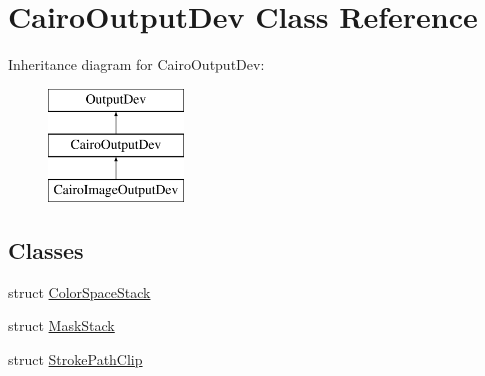 \hypertarget{class_cairo_output_dev}{}\section{Cairo\+Output\+Dev Class Reference}
\label{class_cairo_output_dev}
Inheritance diagram for Cairo\+Output\+Dev\+:\begin{figure}[H]
\begin{center}
\leavevmode
\includegraphics[height=3.000000cm]{class_cairo_output_dev}
\end{center}
\end{figure}
\subsection*{Classes}
\begin{DoxyCompactItemize}
\item 
struct \hyperlink{struct_cairo_output_dev_1_1_color_space_stack}{Color\+Space\+Stack}
\item 
struct \hyperlink{struct_cairo_output_dev_1_1_mask_stack}{Mask\+Stack}
\item 
struct \hyperlink{struct_cairo_output_dev_1_1_stroke_path_clip}{Stroke\+Path\+Clip}
\end{DoxyCompactItemize}
